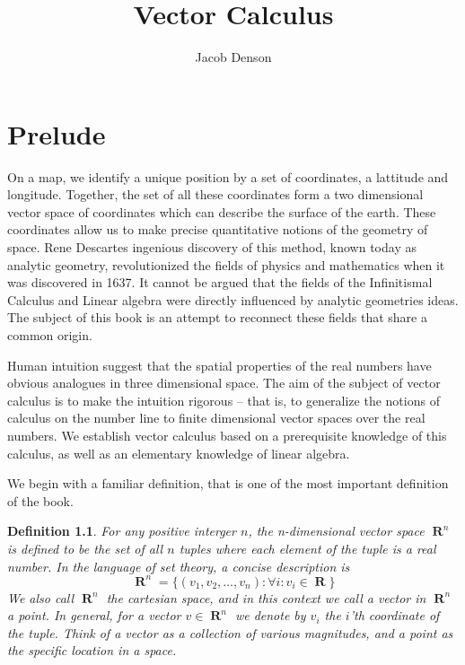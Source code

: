 \documentclass{report}
\title{Vector Calculus}
\author{Jacob Denson}
\newtheorem{definition}{Definition}
\DeclareMathOperator{\real}{\mathbf{R}}
\begin{document}
\maketitle










\chapter{Prelude}

On a map, we identify a unique position by a set of coordinates, a lattitude and longitude. Together, the set of all these coordinates form a two dimensional vector space of coordinates which can describe the surface of the earth. These coordinates allow us to make precise quantitative notions of the geometry of space. Rene Descartes ingenious discovery of this method, known today as analytic geometry, revolutionized the fields of physics and mathematics when it was discovered in 1637. It cannot be argued that the fields of the Infinitismal Calculus and Linear algebra were directly influenced by analytic geometries ideas. The subject of this book is an attempt to reconnect these fields that share a common origin.

Human intuition suggest that the spatial properties of the real numbers have obvious analogues in three dimensional space. The aim of the subject of vector calculus is to make the intuition rigorous -- that is, to generalize the notions of calculus on the number line to finite dimensional vector spaces over the real numbers. We establish vector calculus based on a prerequisite knowledge of this calculus, as well as an elementary knowledge of linear algebra.

We begin with a familiar definition, that is one of the most important definition of the book.

\begin{definition}
  For any positive interger $n$, the n-dimensional vector space $\real^n$ is defined to be the set of all $n$ tuples where each element of the tuple is a real number. In the language of set theory, a concise description is
  \[ \real^n = \{ (v_1, v_2, \dots, v_n) : \forall i : v_i \in \real \} \]
  We also call $\real^n$ the cartesian space, and in this context we call a vector in $\real^n$ a point. In general, for a vector $v \in \real^n$ we denote by $v_i$ the $i$'th coordinate of the tuple. Think of a vector as a collection of various magnitudes, and a point as the specific location in a space.
\end{definition}
\end{document}
